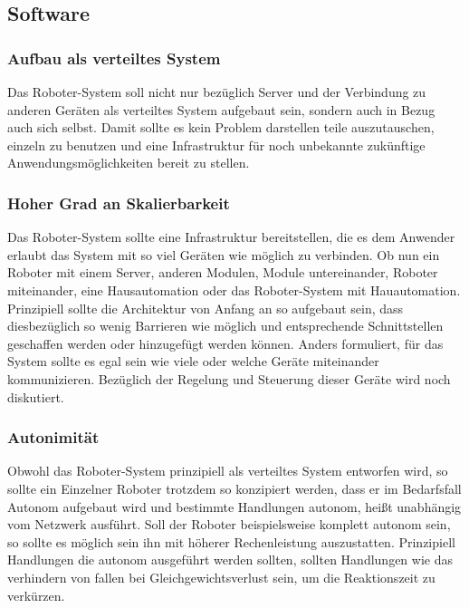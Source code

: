 \documentclass[11pt]{amsart}
\begin{document}
\subsection{Software}

\subsubsection{Aufbau als verteiltes System}
Das Roboter-System soll nicht nur bez\"uglich Server und der Verbindung zu anderen Ger\"aten als verteiltes System aufgebaut sein, sondern auch in Bezug auch sich selbst. Damit sollte es kein Problem darstellen teile auszutauschen, einzeln zu benutzen und eine Infrastruktur f\"ur noch unbekannte zuk\"unftige Anwendungsm\"oglichkeiten bereit zu stellen.
\subsubsection{Hoher Grad an Skalierbarkeit}
Das Roboter-System sollte eine Infrastruktur bereitstellen, die es dem Anwender erlaubt das System mit so viel Ger\"aten wie m\"oglich zu verbinden. Ob nun ein Roboter mit einem Server, anderen Modulen, Module untereinander, Roboter miteinander, eine Hausautomation oder das Roboter-System mit Hauautomation. Prinzipiell sollte die Architektur von Anfang an so aufgebaut sein, dass diesbez\"uglich so wenig Barrieren wie m\"oglich und entsprechende Schnittstellen geschaffen werden oder hinzugef\"ugt werden k\"onnen. Anders formuliert, f\"ur das System sollte es egal sein wie viele oder welche Ger\"ate miteinander kommunizieren. Bez\"uglich der Regelung und Steuerung dieser Ger\"ate wird noch diskutiert.
\subsubsection{Autonimit\"at}
Obwohl das Roboter-System prinzipiell als verteiltes System entworfen wird, so sollte ein Einzelner Roboter trotzdem so konzipiert werden, dass er im Bedarfsfall Autonom aufgebaut wird und bestimmte Handlungen autonom, hei\ss{}t unabh\"angig vom Netzwerk ausf\"uhrt. Soll der Roboter beispielsweise komplett autonom sein, so sollte es m\"oglich sein ihn mit h\"oherer Rechenleistung auszustatten. Prinzipiell Handlungen die autonom ausgef\"uhrt werden sollten, sollten Handlungen wie das verhindern von fallen bei Gleichgewichtsverlust sein, um die Reaktionszeit zu verk\"urzen. 
\end{document}
